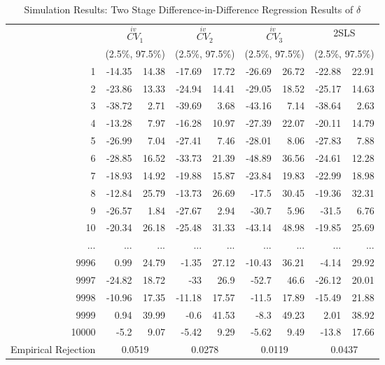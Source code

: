 \begin{table}[ht]
  \caption{Simulation Results: Two Stage Difference-in-Difference Regression Results of $\hat{\delta}$}
  \centering
  \begin{tabular}{rrrrrrrrr}
      \hline
      &\multicolumn{2}{c}{$\overset{iv}{CV}_{1}$} &\multicolumn{2}{c}{$\overset{iv}{CV}_{2}$} &\multicolumn{2}{c}{$\overset{iv}{CV}_{3}$} &\multicolumn{2}{c}{2SLS} \\
      &\multicolumn{2}{c}{(2.5\%, 97.5\%)} &\multicolumn{2}{c}{(2.5\%, 97.5\%)} &\multicolumn{2}{c}{(2.5\%, 97.5\%)} &\multicolumn{2}{c}{(2.5\%, 97.5\%)}\\
      \hline
      1 & -14.35 & 14.38 & -17.69 & 17.72 & -26.69 & 26.72 & -22.88 & 22.91 \\
      2 & -23.86 & 13.33 & -24.94 & 14.41 & -29.05 & 18.52 & -25.17 & 14.63 \\
      3 & -38.72 & 2.71 & -39.69 & 3.68 & -43.16 & 7.14 & -38.64 & 2.63 \\
      4 & -13.28 & 7.97 & -16.28 & 10.97 & -27.39 & 22.07 & -20.11 & 14.79 \\
      5 & -26.99 & 7.04 & -27.41 & 7.46 & -28.01 & 8.06 & -27.83 & 7.88 \\
      6 & -28.85 & 16.52 & -33.73 & 21.39 & -48.89 & 36.56 & -24.61 & 12.28 \\
      7 & -18.93 & 14.92 & -19.88 & 15.87 & -23.84 & 19.83 & -22.99 & 18.98 \\
      8 & -12.84 & 25.79 & -13.73 & 26.69 & -17.5 & 30.45 & -19.36 & 32.31 \\
      9 & -26.57 & 1.84 & -27.67 & 2.94 & -30.7 & 5.96 & -31.5 & 6.76 \\
      10 & -20.34 & 26.18 & -25.48 & 31.33 & -43.14 & 48.98 & -19.85 & 25.69 \\
      ... & ... & ... & ... & ... & ... & ... & ... & ... \\
      9996 & 0.99 & 24.79 & -1.35 & 27.12 & -10.43 & 36.21 & -4.14 & 29.92 \\
      9997 & -24.82 & 18.72 & -33 & 26.9 & -52.7 & 46.6 & -26.12 & 20.01 \\
      9998 & -10.96 & 17.35 & -11.18 & 17.57 & -11.5 & 17.89 & -15.49 & 21.88 \\
      9999 & 0.94 & 39.99 & -0.6 & 41.53 & -8.3 & 49.23 & 2.01 & 38.92 \\
      10000 & -5.2 & 9.07 & -5.42 & 9.29 & -5.62 & 9.49 & -13.8 & 17.66 \\
      \hline
      Empirical Rejection & \multicolumn{2}{c}{0.0519} & \multicolumn{2}{c}{0.0278} & \multicolumn{2}{c}{0.0119} & \multicolumn{2}{c}{0.0437} \\
      \hline
    \end{tabular}
\end{table}
